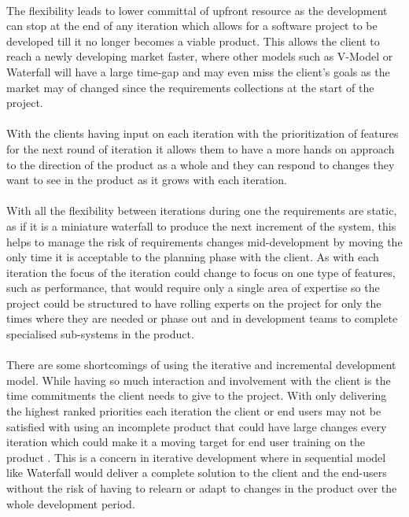 \documentclass{style/CRPITStyle}
\renewcommand{\cite}{\citep}
\begin{document}
\paragraph{}

The flexibility leads to lower committal of upfront resource as the development
can stop at the end of any iteration which allows for a software project to be
developed till it no longer becomes a viable product.
This allows the client to reach a newly developing market faster, where other
models such as V-Model or Waterfall will have a large time-gap and may even miss
the client's goals as the market may of changed since the requirements
collections at the start of the project.

\paragraph{}

With the clients having input on each iteration with the prioritization of
features for the next round of iteration it allows them to have a more hands on
approach to the direction of the product as a whole and they can respond to
changes they want to see in the product as it grows with each iteration.

\paragraph{}

With all the flexibility between iterations during one the requirements are
static, as if it is a miniature waterfall to produce the next increment of the
system, this helps to manage the risk of requirements changes mid-development
by moving the only time it is acceptable to the planning phase with the client.
As with each iteration the focus of the iteration could change to focus on one
type of features, such as performance, that would require only a single area
of expertise so the project could be structured to have rolling experts on the
project for only the times where they are needed or phase out and in development
teams to complete specialised sub-systems in the product.

\paragraph{}

There are some shortcomings of using the iterative and incremental development model.
While having so much interaction and involvement with the client is the time
commitments the client needs to give to the project.
With only delivering the highest ranked priorities each iteration the client or end users may not be
satisfied with using an incomplete product that could have large changes every
iteration which could make it a moving target for end user training on the
product \cite{sommerville:1996}. This is a concern in iterative development where in sequential model
like Waterfall would deliver a complete solution to the client and the end-users
without the risk of having to relearn or adapt to changes in the product over
the whole development period.
\end{document}

